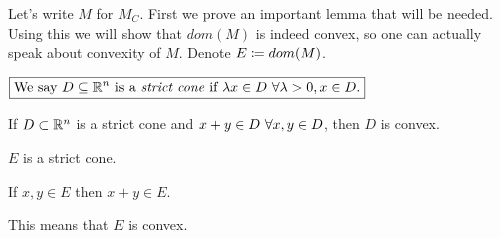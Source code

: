 \soln

Let's write $M$ for $M_{C}$. First we prove an important lemma that will be needed. Using this we will show that $dom(M)$ is indeed convex, so one can actually speak about convexity of $M$. Denote $E\coloneqq dom(M)$. 

$\boxed{\text{We say } D\subseteq\mathbb{R}^{n}\text{ is a \textit{strict cone} if }\lambda x\in D~\forall \lambda>0,x\in D.}$
\begin{prop}
If $D\subset\mathbb{R}^{n}$ is a strict cone and $x+y\in D~\forall x,y\in D$, then $D$ is convex.
\end{prop}




\begin{cl}\label{strictcone}
$E$ is a strict cone.
\end{cl}

\begin{cl}\label{sum}
If $x,y\in E$ then $x+y\in E$.
\end{cl}

This means that $E$ is convex. 

